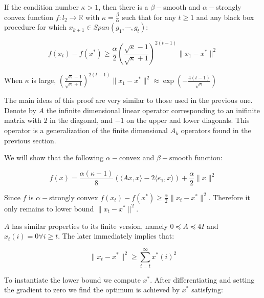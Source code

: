 \begin{theorem}
If the condition number $\kappa > 1$, then there is a $\beta-$smooth and $\alpha-$strongly convex function $f: l_2 \rightarrow \mathbb{R}$ with $\kappa = \frac{\beta}{\alpha}$ such that for any $t \geq 1$ and any black box procedure for which $x_{k+1} \in Span( g_1, \cdots, g_t)$:

\begin{equation}
f(x_t) - f(x^*) \geq \frac{\alpha}{2} \left(\frac{ \sqrt{\kappa}-1}{\sqrt{\kappa}+1}\right)^{2(t-1)} \parallel x_1 - x^* \parallel^2
\end{equation}

When $\kappa$ is large, $\left(\frac{ \sqrt{\kappa}-1}{\sqrt{\kappa}+1}\right)^{2(t-1)} \parallel x_1 - x^* \parallel^2 \approx \exp( -\frac{4(t-1)}{\sqrt{\kappa}})$


\end{theorem}

\proofstart

The main ideas of this proof are very similar to those used in the previous one. Denote by $A$ the infinite dimensional linear operator corresponding to an inifinite matrix with $2$ in the diagonal, and $-1$ on the upper and lower diagonals. This operator is a generalization of the finite dimensional $A_k$ operators found in the previous section. 

We will show that the following $\alpha-$convex and $\beta-$smooth function:

\begin{equation}
f(x) = \frac{\alpha(\kappa-1)}{8} \left( \langle Ax, x \rangle - 2\langle e_1, x \rangle \right) + \frac{\alpha}{2} \parallel x \parallel^2
\end{equation}


Since $f$ is $\alpha-$strongly convex $f(x_t) - f(x^*) \geq \frac{\alpha}{2}\parallel x_t - x^*\parallel^2$. Therefore it only remains to lower bound $\parallel x_t - x^*\parallel^2$.

$A$ has similar properties to its finite version, namely $0 \preceq A \preceq 4I$ and $x_t(i) =0 \forall i \geq t$. The later immediately implies that: 

\begin{equation}
\parallel x_t - x^* \parallel^2 \geq \sum_{i=t}^\infty x^*(i)^2
\end{equation}

To instantiate the lower bound we compute $x^*$. After differentiating and setting the gradient to zero we find the optimum is achieved by $x^*$ satisfying:

